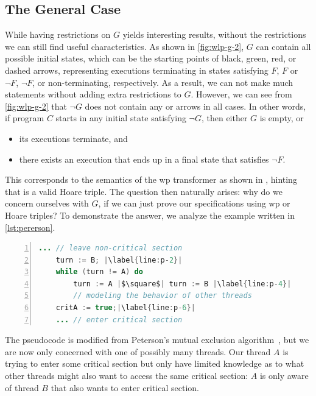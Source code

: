 \subsection{The General Case}
While having restrictions on $G$ yields interesting results, without the restrictions we can still find useful characteristics. 
As shown in \autoref{fig:wlp-g-2}, $G$ can contain all possible initial states, which can be the starting points of black, green, red, or dashed arrows, representing executions terminating in states satisfying $F$, $F$ or $\neg F$, $\neg F$, or non-terminating, respectively. 
As a result, we can not make much statements without adding extra restrictions to $G$. 
However, we can see from \autoref{fig:wlp-g-2} that $\neg G$ does not contain any  or  arrows in all cases. 
In other words, if program $C$ starts in any initial state satisfying $\neg G$, then either $G$ is empty, or
\begin{itemize}
	\item its executions terminate, and
	\item there exists an execution that ends up in a final state that satisfies $\neg F$. 
\end{itemize}

This corresponds to the semantics of the wp transformer as shown in , hinting that  is a valid Hoare triple. 
The question then naturally arises: why do we concern ourselves with $G$, if we can just prove our specifications using wp or Hoare triples? 
To demonstrate the answer, we analyze the example written in \autoref{lst:pererson}. 

\begin{lstlisting}[caption={Thread $A$ Hoping to Access Critical Section}, label={lst:pererson}, language=java, numbers=left, stepnumber=1, captionpos=b,escapechar=|,frame=single]
	... // leave non-critical section
	turn := B; |\label{line:p-2}|
	while (turn != A) do 
		turn := A |$\square$| turn := B |\label{line:p-4}|
		// modeling the behavior of other threads
	critA := true;|\label{line:p-6}|
	... // enter critical section  
\end{lstlisting}

The pseudocode is modified from Peterson's mutual exclusion algorithm~\cite{peterson1981}, but we are now only concerned with one of possibly many threads.
Our thread $A$ is trying to enter some critical section but only have limited knowledge as to what other threads might also want to access the same critical section: $A$ is only aware of thread $B$ that also wants to enter critical section. 

